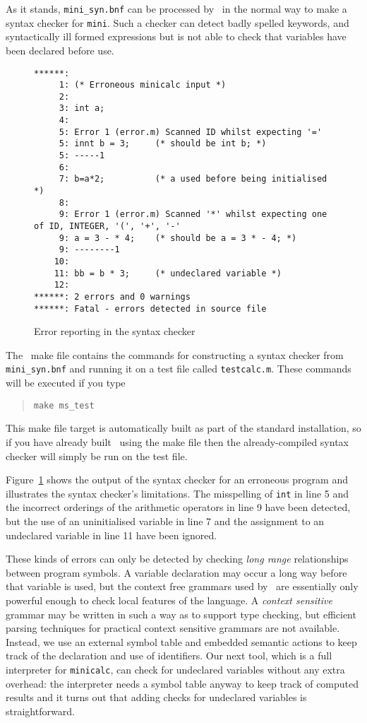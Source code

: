 {As it stands, \verb+mini_syn.bnf+ can be processed by \rdp\ in the normal
way to make a syntax checker for {\tt mini}. Such a checker can detect
badly spelled keywords, and syntactically ill formed expressions but is
not able to check that variables have been declared before use.
\begin{figure}
\hspace*{-1cm}
\begin{minipage}{30cm}
\footnotesize
\begin{verbatim}
******: 
     1: (* Erroneous minicalc input *)
     2: 
     3: int a;
     4: 
     5: Error 1 (error.m) Scanned ID whilst expecting '='
     5: innt b = 3;     (* should be int b; *)
     5: -----1
     6: 
     7: b=a*2;          (* a used before being initialised *)
     8: 
     9: Error 1 (error.m) Scanned '*' whilst expecting one of ID, INTEGER, '(', '+', '-'
     9: a = 3 - * 4;    (* should be a = 3 * - 4; *)
     9: --------1
    10: 
    11: bb = b * 3;     (* undeclared variable *)
    12: 
******: 2 errors and 0 warnings
******: Fatal - errors detected in source file
\end{verbatim}
\end{minipage}
\caption{Error reporting in the syntax checker}
\label{minicalc:errors}
\end{figure}

The \rdp\ make file contains the commands for constructing a syntax checker from
\verb+mini_syn.bnf+ and running it on a test file called \verb+testcalc.m+. These commands
will be executed if you type
\begin{quote}
\verb+make ms_test+
\end{quote}
This make file target is automatically built as part of the standard installation, so if
you have already built \rdp\ using the make file then the already-compiled syntax checker will
simply be run on the test file. 

Figure~\ref{minicalc:errors} shows the output of the syntax checker for
an erroneous program and illustrates the syntax checker's limitations.
The misspelling of {\tt int} in line 5 and the incorrect orderings of the
arithmetic operators in line 9 have been detected, but the use of an
uninitialised variable in line 7 and the assignment to an undeclared
variable in line 11 have been ignored.

These kinds of errors can only be detected  by checking {\em long range}
relationships between program symbols. A variable declaration may occur
a long way before that variable is used, but the context free grammars
used by \rdp\ are essentially only powerful enough to check local
features of the language. A {\em context sensitive} grammar may be
written in such a way as to support type checking, but efficient parsing
techniques for practical context sensitive grammars are not available.
Instead, we use an external symbol table and embedded semantic actions
to keep track of the declaration and use of identifiers. Our next tool,
which is a full interpreter for {\tt minicalc}, can check for undeclared
variables without any extra overhead: the interpreter needs a symbol
table anyway to keep track of computed results and it turns out that
adding checks for undeclared variables is straightforward.

}
